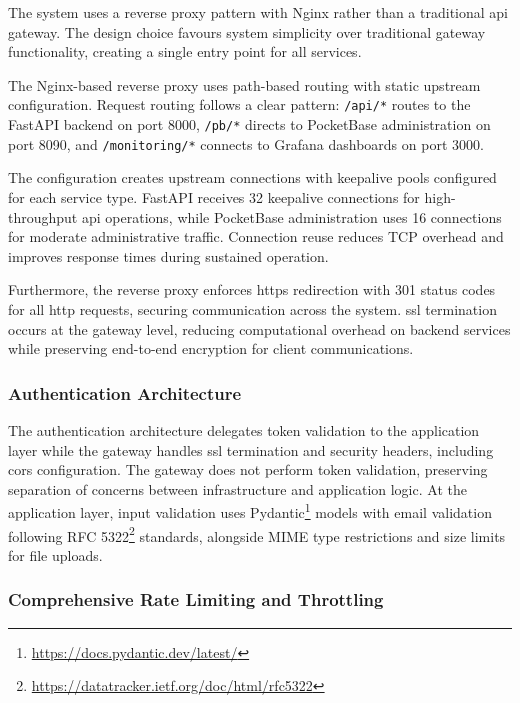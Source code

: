 The system uses a reverse proxy pattern with Nginx rather than a traditional \ac{api} gateway. The design choice favours system simplicity over traditional gateway functionality, creating a single entry point for all services.

The Nginx-based reverse proxy uses path-based routing with static upstream configuration. Request routing follows a clear pattern: \texttt{/api/*} routes to the FastAPI backend on port 8000, \texttt{/pb/*} directs to PocketBase administration on port 8090, and \texttt{/monitoring/*} connects to Grafana dashboards on port 3000.

The configuration creates upstream connections with keepalive pools configured for each service type. FastAPI receives 32 keepalive connections for high-throughput \ac{api} operations, while PocketBase administration uses 16 connections for moderate administrative traffic. Connection reuse reduces TCP overhead and improves response times during sustained operation.


Furthermore, the reverse proxy enforces \ac{https} redirection with 301 status codes for all \ac{http} requests, securing communication across the system. \ac{ssl} termination occurs at the gateway level, reducing computational overhead on backend services while preserving end-to-end encryption for client communications.

\subsubsection{Authentication Architecture} \label{subsubsection:auth_authorization}

The authentication architecture delegates token validation to the application layer while the gateway handles \ac{ssl} termination and security headers, including \ac{cors} configuration. The gateway does not perform token validation, preserving separation of concerns between infrastructure and application logic. At the application layer, input validation uses Pydantic\footnote{\url{https://docs.pydantic.dev/latest/}} models with email validation following RFC 5322\footnote{\url{https://datatracker.ietf.org/doc/html/rfc5322}} standards, alongside MIME type restrictions and size limits for file uploads.

\subsubsection{Comprehensive Rate Limiting and Throttling} \label{subsubsection:rate_limiting}

